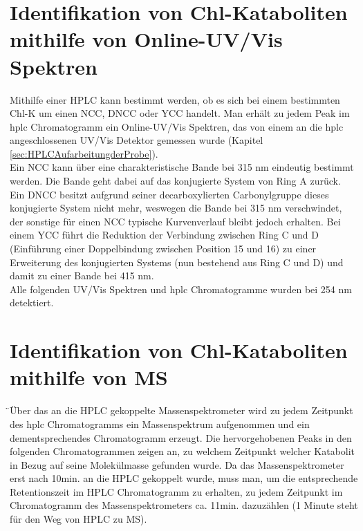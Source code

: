 \section{Identifikation von Chl-Kataboliten mithilfe von Online-UV/Vis Spektren} \label{sec:IdentifikationUVVis}

Mithilfe einer HPLC kann bestimmt werden, ob es sich bei einem bestimmten \gls{Chl-K} um einen \gls{NCC}, \gls{DNCC} oder \gls{YCC} handelt. Man erhält zu jedem Peak im \gls{hplc} Chromatogramm ein Online-UV/Vis Spektren, das von einem an die \gls{hplc} angeschlossenen UV/Vis Detektor gemessen wurde (Kapitel \ref{sec:HPLCAufarbeitungderProbe}). \\

Ein \gls{NCC} kann über eine charakteristische Bande bei 315 nm eindeutig bestimmt werden. Die Bande geht dabei auf das konjugierte System von Ring A zurück. Ein \gls{DNCC} besitzt aufgrund seiner decarboxylierten Carbonylgruppe dieses konjugierte System nicht mehr, weswegen die Bande bei 315 nm verschwindet, der sonstige für einen \gls{NCC} typische Kurvenverlauf bleibt jedoch erhalten. Bei einem \gls{YCC} führt die Reduktion der Verbindung zwischen Ring C und D (Einführung einer Doppelbindung zwischen Position 15 und 16) zu einer Erweiterung des konjugierten Systems (nun bestehend aus Ring C und D) und damit zu einer Bande bei 415 nm. \\

Alle folgenden UV/Vis Spektren und \gls{hplc} Chromatogramme wurden bei 254 nm detektiert.

\section{Identifikation von Chl-Kataboliten mithilfe von MS} \label{sec:IdentifikationMS}

̈Über das an die HPLC gekoppelte Massenspektrometer wird zu jedem Zeitpunkt des \gls{hplc} Chromatogramms ein Massenspektrum aufgenommen und ein dementsprechendes Chromatogramm erzeugt. Die hervorgehobenen Peaks in den folgenden Chromatogrammen zeigen an, zu welchem Zeitpunkt welcher Katabolit in Bezug auf seine Molekülmasse gefunden wurde. Da das Massenspektrometer erst nach 10min. an die HPLC gekoppelt wurde, muss man, um die entsprechende Retentionszeit im HPLC Chromatogramm zu erhalten, zu jedem Zeitpunkt im Chromatogramm des Massenspektrometers ca. 11min. dazuzählen (1 Minute steht für den Weg von HPLC zu MS).  \\

